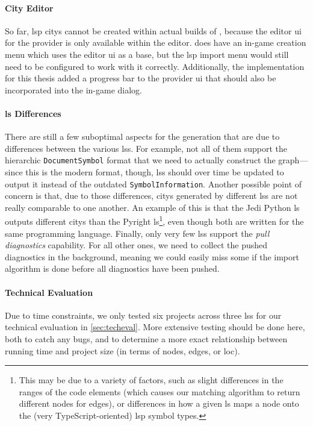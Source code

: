 \documentclass[../thesis]{subfiles}
\begin{document}
\paragraph{City Editor}
So far, \gls{lsp} \glspl{city} cannot be created within actual builds of \SEE{}, because the editor \gls{ui} for the \gls{provider} is only available within the \gls{editor}.
\SEE{} does have an in-game  creation menu which uses the editor \gls{ui} as a base, but the \gls{lsp} import menu would still need to be configured to work with it correctly.
Additionally, the implementation for this thesis added a progress bar to the \gls{provider} \gls{ui} that should also be incorporated into the in-game dialog.

\paragraph{\Gls{ls} Differences}
There are still a few suboptimal aspects for the  generation that are due to differences between the various \glspl{ls}.
For example, not all of them support the hierarchic \texttt{DocumentSymbol} format that we need to actually construct the graph---since this is the modern format, though, \glspl{ls} should over time be updated to output it instead of the outdated \texttt{SymbolInformation}.
Another possible point of concern is that, due to those differences, \glspl{city} generated by different \glspl{ls} are not really comparable to one another.
An example of this is that the Jedi Python \gls{ls} outputs different \glspl{city} than the Pyright \gls{ls}\footnote{
	This may be due to a variety of factors, such as slight differences in the \glspl{range} of the code elements (which causes our matching algorithm to return different nodes for edges), or differences in how a given \gls{ls} maps a node onto the (very TypeScript-oriented) \gls{lsp} symbol types.
}, even though both are written for the same programming language.
Finally, only very few \glspl{ls} support the \emph{pull diagnostics} \gls{capability}.
For all other ones, we need to collect the pushed diagnostics in the background, meaning we could easily miss some if the import algorithm is done before all diagnostics have been pushed.

\paragraph{Technical Evaluation}
Due to time constraints, we only tested six projects across three \glspl{ls} for our technical evaluation in \cref{sec:techeval}.
More extensive testing should be done here, both to catch any bugs, and to determine a more exact relationship between running time and project size (in terms of nodes, edges, or \gls{loc}).
\end{document}

